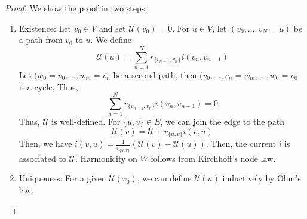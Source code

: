 \begin{proof}
    We show the proof in two steps:
    \begin{enumerate}[]
      \item Existence: Let \(v_0\in V\) and set \(\mathcal{U}(v_0)=0\). For \(u\in V\), let \((v_0,\dots, v_N=u)\) be a path from \(v_0\) to \(u\). We define \[\mathcal{U}(u)=\sum_{n=1}^{N}r_{\{v_{n-1},v_{n}\}}i(v_{n}, v_{n-1}) \]
        Let \((w_0=v_0, \dots, w_m=v_n\) be a second path, then \((v_0, \dots, v_n=w_m, \dots, w_0=v_0\) is a cycle, Thus, 
        \[\sum_{n=1}^{N} r_{\{v_{n-1},v_n\}} i(v_{n},v_{n-1})=0 \]
        Thus, \(\mathcal{U}\) is well-defined. For \(\{u,v\} \in E\), we can join the edge to the path \[\mathcal{U}(v) = \mathcal{U}+r_{\{u,v\}}i(v,u)\]
        Then, we have \(i(v,u) = \frac{1}{r_{\{u,v\}}} \left(\mathcal{U}(v)-\mathcal{U}(u)\right)\). Then, the current \(i\) is associated to \(\mathcal{U}\). Harmonicity on \(W\) follows from Kirchhoff's node law.
      \item Uniqueness: For a given \(\mathcal{U}(v_0)\), we can define \(\mathcal{U}(u)\) inductively by Ohm's law. 
    \end{enumerate}
    
\end{proof}

